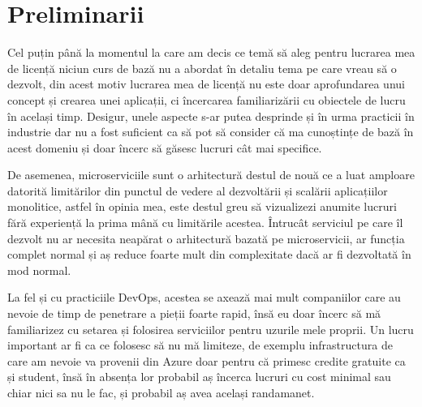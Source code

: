 \chapter{Preliminarii}
Cel puțin până la momentul la care am decis ce temă să aleg pentru lucrarea mea de licență niciun curs de bază 
nu a abordat în detaliu tema pe care vreau să o dezvolt, din acest motiv lucrarea mea de licență nu este doar
aprofundarea unui concept și crearea unei aplicații, ci încercarea familiarizării cu obiectele de lucru în același timp.
Desigur, unele aspecte s-ar putea desprinde și în urma practicii în industrie dar nu a fost suficient ca să
pot să consider că ma cunoștințe de bază în acest domeniu și doar încerc să găsesc lucruri cât mai specifice.

De asemenea, microserviciile sunt o arhitectură destul de nouă ce a luat amploare datorită limitărilor din
punctul de vedere al dezvoltării și scalării aplicațiilor monolitice, astfel în opinia mea, este destul
greu să vizualizezi anumite lucruri fără experiență la prima mână cu limitările acestea. Întrucât serviciul
pe care îl dezvolt nu ar necesita neapărat o arhitectură bazată pe microservicii, ar funcția complet normal
și aș reduce foarte mult din complexitate dacă ar fi dezvoltată în mod normal.

La fel și cu practiciile DevOps, acestea se axează mai mult companiilor care au nevoie de timp de penetrare a
pieții foarte rapid, însă eu doar încerc să mă familiarizez cu setarea și folosirea serviciilor pentru uzurile 
mele proprii. Un lucru important ar fi ca ce folosesc să nu mă limiteze, de exemplu infrastructura de care am 
nevoie va provenii din Azure doar pentru că primesc credite gratuite ca și student, însă în absența lor probabil
aș încerca lucruri cu cost minimal sau chiar nici sa nu le fac, și probabil aș avea același randamanet. 